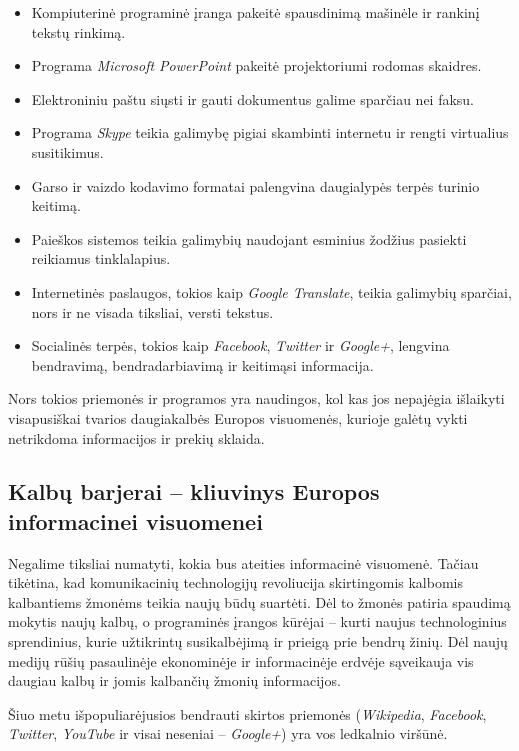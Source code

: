 \begin{multicols}{2}
\begin{itemize}
\item Kompiuterinė programinė įranga pakeitė spausdinimą mašinėle ir rankinį tekstų rinkimą.
\item Programa \textit{Microsoft PowerPoint} pakeitė projektoriumi rodomas skaidres.
\item Elektroniniu paštu siųsti ir gauti dokumentus galime sparčiau nei faksu.
\item Programa \textit{Skype} teikia galimybę pigiai skambinti internetu ir rengti virtualius susitikimus.
\item Garso ir vaizdo kodavimo formatai palengvina daugialypės terpės turinio keitimą.
\item Paieškos sistemos teikia galimybių naudojant esminius žodžius pasiekti reikiamus tinklalapius.
\item Internetinės paslaugos, tokios kaip \textit{Google Translate}, teikia galimybių sparčiai, nors ir ne visada tiksliai, versti tekstus.
\item Socialinės terpės, tokios kaip \textit{Facebook}, \textit{Twitter} ir \textit{Google+}, lengvina bendravimą, bendradarbiavimą ir keitimąsi informacija.
\end{itemize}

Nors tokios priemonės ir programos yra naudingos, kol kas jos nepajėgia išlaikyti visapusiškai tvarios daugiakalbės Europos visuomenės, kurioje galėtų vykti netrikdoma informacijos ir prekių sklaida.

\subsection{Kalbų barjerai – kliuvinys Europos informacinei visuomenei}
  
 Negalime tiksliai numatyti, kokia bus ateities informacinė visuomenė. Tačiau tikėtina, kad komunikacinių technologijų revoliucija skirtingomis kalbomis kalbantiems žmonėms teikia naujų būdų suartėti. Dėl to žmonės patiria spaudimą mokytis naujų kalbų, o programinės įrangos kūrėjai – kurti naujus technologinius sprendinius, kurie užtikrintų susikalbėjimą ir prieigą prie bendrų žinių. Dėl naujų medijų rūšių pasaulinėje ekonominėje ir informacinėje erdvėje sąveikauja vis daugiau kalbų ir jomis kalbančių žmonių informacijos. 


Šiuo metu išpopuliarėjusios bendrauti skirtos priemonės (\textit{Wikipedia}, \textit{Facebook}, \textit{Twitter}, \textit{YouTube} ir visai neseniai – \textit{Google+}) yra vos ledkalnio viršūnė.


\end{multicols}
